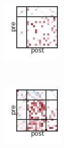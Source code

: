 \begin{figure}[t!]
\begin{subfigure}[b]{1.25in}
  \end{subfigure}
  ~
  \hspace{-.1in}
  \begin{subfigure}[b]{1.10in}
    \centering
    \includegraphics[width=\textwidth]{figures/ch3/Bernoulli-SBM.png}
  \end{subfigure}
  ~
  \hspace{-.1in}
  \begin{subfigure}[b]{1.10in}
    \centering
    \includegraphics[width=\textwidth]{figures/ch3/SBM-SBM.png}

\end{subfigure}
\end{figure}
